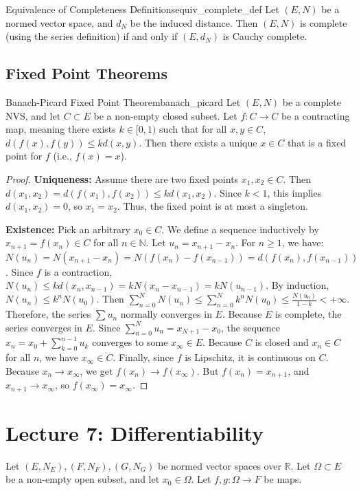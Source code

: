 \documentclass[11pt, a4paper]{article}
\newcommand{\R}{\mathbb{R}}
\newcommand{\N}{\mathbb{N}}
\begin{document}
\begin{theorem}{Equivalence of Completeness Definitions}{equiv_complete_def}
Let $(E, N)$ be a normed vector space, and $d_N$ be the induced distance. Then $(E, N)$ is complete (using the series definition) if and only if $(E, d_N)$ is Cauchy complete.
\end{theorem}

\subsection{Fixed Point Theorems}
\begin{theorem}{Banach-Picard Fixed Point Theorem}{banach_picard}
Let $(E, N)$ be a complete NVS, and let $C \subset E$ be a non-empty closed subset. Let $f: C \to C$ be a contracting map, meaning there exists $k \in [0, 1)$ such that for all $x, y \in C$, $d(f(x), f(y)) \le k d(x, y)$.
Then there exists a unique $x \in C$ that is a fixed point for $f$ (i.e., $f(x) = x$).
\end{theorem}
\begin{proof}
\textbf{Uniqueness:} Assume there are two fixed points $x_1, x_2 \in C$. Then $d(x_1, x_2) = d(f(x_1), f(x_2)) \le k d(x_1, x_2)$. Since $k < 1$, this implies $d(x_1, x_2) = 0$, so $x_1 = x_2$. Thus, the fixed point is at most a singleton.

\textbf{Existence:} Pick an arbitrary $x_0 \in C$. We define a sequence inductively by $x_{n+1} = f(x_n) \in C$ for all $n \in \N$.
Let $u_n = x_{n+1} - x_n$. For $n \ge 1$, we have:
$N(u_n) = N(x_{n+1} - x_n) = N(f(x_n) - f(x_{n-1})) = d(f(x_n), f(x_{n-1}))$.
Since $f$ is a contraction, $N(u_n) \le k d(x_n, x_{n-1}) = k N(x_n - x_{n-1}) = k N(u_{n-1})$.
By induction, $N(u_n) \le k^n N(u_0)$.
Then $\sum_{n=0}^N N(u_n) \le \sum_{n=0}^N k^n N(u_0) \le \frac{N(u_0)}{1-k} < +\infty$.
Therefore, the series $\sum u_n$ normally converges in $E$. Because $E$ is complete, the series converges in $E$.
Since $\sum_{n=0}^N u_n = x_{N+1} - x_0$, the sequence $x_n = x_0 + \sum_{k=0}^{n-1} u_k$ converges to some $x_\infty \in E$.
Because $C$ is closed and $x_n \in C$ for all $n$, we have $x_\infty \in C$.
Finally, since $f$ is Lipschitz, it is continuous on $C$. Because $x_n \to x_\infty$, we get $f(x_n) \to f(x_\infty)$.
But $f(x_n) = x_{n+1}$, and $x_{n+1} \to x_\infty$, so $f(x_\infty) = x_\infty$.
\end{proof}

\section{Lecture 7: Differentiability}
Let $(E, N_E), (F, N_F), (G, N_G)$ be normed vector spaces over $\R$.
Let $\Omega \subset E$ be a non-empty open subset, and let $x_0 \in \Omega$.
Let $f, g: \Omega \to F$ be maps.
\end{document}
